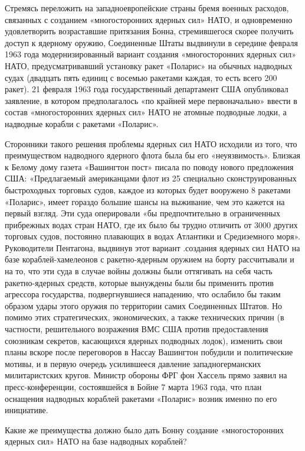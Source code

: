 \documentclass[12pt, a4paper, openany]{book}
\begin{document}
Стремясь переложить на западноевропейские страны бремя военных расходов, связанных с созданием  «многосторонних ядерных сил» НАТО, и одновременно удовлетворить возраставшие притязания Бонна, стремившегося скорее  получить доступ к ядерному оружию, Соединенные Штаты  выдвинули в середине февраля 1963 года модернизированный  вариант создания «многосторонних ядерных сил» НАТО,  предусматривавший установку ракет «Поларис» на обычных  надводных судах (двадцать пять единиц с восемью ракетами каждая, то есть всего 200 ракет). 21 февраля 1963 года  государственный департамент США опубликовал заявление, в  котором предполагалось «по крайней мере первоначально» ввести в состав «многосторонних ядерных сил» НАТО не атомные подводные лодки, а надводные корабли с ракетами «Поларис».

Сторонники такого решения проблемы ядерных сил НАТО исходили из того, что преимуществом надводного ядерного флота была бы его «неуязвимость». Близкая к Белому дому газета «Вашингтон пост» писала по поводу нового  предложения США: «Предлагаемый американцами флот из 25 специально сконструированных быстроходных торговых  судов, каждое из которых будет вооружено 8 ракетами  «Поларис», имеет гораздо большие шансы на выживание, чем это кажется на первый взгляд. Эти суда оперировали «бы  предпочтительно в ограниченных прибрежных водах стран НАТО, где их было бы трудно отличить от 3000 других торговых  судов, постоянно плавающих в водах Атлантики и  Средиземного моря». Руководители Пентагона, выдвинув этот вариант .создания ядерных сил НАТО на базе кораблей-хамелеонов с ракетно-ядерным оружием на борту рассчитывали и на то, что эти суда в случае войны должны были оттягивать на себя часть ракетно-ядерных средств, которые вынуждены были бы применить против агрессора государства, подвергнувшиеся нападению, что ослабило бы таким образом удары этого оружия по территории самих Соединенных Штатов. Но  помимо этих стратегических, экономических, а также технических причин (в частности, решительного возражения ВМС США против предоставления союзникам секретов, касающихся ядерных подводных лодок), изменить свои планы вскоре  после переговоров в Нассау Вашингтон побудили и  политические мотивы, и в первую очередь усилившееся давление  западногерманских милитаристских кругов. Министр обороны ФРГ фон Хассель прямо заявил на пресс-конференции, состоявшейся в Бойне 7 марта 1963 года, что план оснащения надводных кораблей ракетами «Поларис» возник именно по его инициативе.

Какие же преимущества должно было дать Бонну создание «многосторонних ядерных сил» НАТО на базе надводных кораблей?
\end{document}

